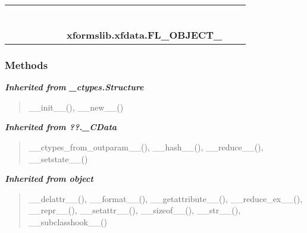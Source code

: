     \label{xformslib:xfdata:FL_OBJECT_}
\begin{tabular}{cccccccccc}
\multicolumn{2}{r}{\settowidth{\BCL}{object}\multirow{2}{\BCL}{object}}
&&
&&
&&
  \\\cline{3-3}
  &&\multicolumn{1}{c|}{}
&&
&&
&&
  \\
\multicolumn{4}{r}{\settowidth{\BCL}{??.\_CData}\multirow{2}{\BCL}{??.\_CData}}
&&
&&
  \\\cline{5-5}
  &&&&\multicolumn{1}{c|}{}
&&
&&
  \\
\multicolumn{6}{r}{\settowidth{\BCL}{\_ctypes.Structure}\multirow{2}{\BCL}{\_ctypes.Structure}}
&&
  \\\cline{7-7}
  &&&&&&\multicolumn{1}{c|}{}
&&
  \\
&&&&&&\multicolumn{2}{l}{\textbf{xformslib.xfdata.FL\_OBJECT\_}}
\end{tabular}



  \subsubsection{Methods}


\large{\textbf{\textit{Inherited from \_ctypes.Structure}}}

\begin{quote}
\_\_init\_\_(), \_\_new\_\_()
\end{quote}

\large{\textbf{\textit{Inherited from ??.\_CData}}}

\begin{quote}
\_\_ctypes\_from\_outparam\_\_(), \_\_hash\_\_(), \_\_reduce\_\_(), \_\_setstate\_\_()
\end{quote}

\large{\textbf{\textit{Inherited from object}}}

\begin{quote}
\_\_delattr\_\_(), \_\_format\_\_(), \_\_getattribute\_\_(), \_\_reduce\_ex\_\_(), \_\_repr\_\_(), \_\_setattr\_\_(), \_\_sizeof\_\_(), \_\_str\_\_(), \_\_subclasshook\_\_()
\end{quote}


